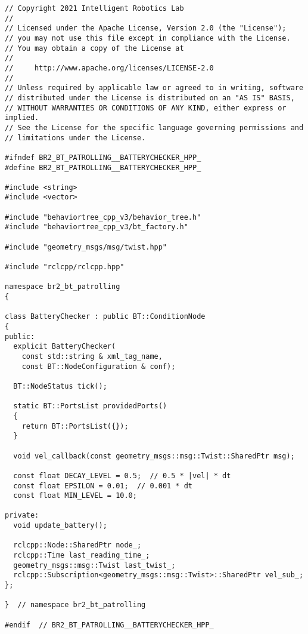  \footnotesize
\begin{tcolorbox}[sharp corners, colframe=gray!80, colback=LightGray, left=0pt, top=0pt, bottom=0pt, title=\texttt{br2\_bt\_patrolling/include/br2\_bt\_patrolling/BatteryChecker.hpp}]
  \begin{verbatim}
// Copyright 2021 Intelligent Robotics Lab
//
// Licensed under the Apache License, Version 2.0 (the "License");
// you may not use this file except in compliance with the License.
// You may obtain a copy of the License at
//
//     http://www.apache.org/licenses/LICENSE-2.0
//
// Unless required by applicable law or agreed to in writing, software
// distributed under the License is distributed on an "AS IS" BASIS,
// WITHOUT WARRANTIES OR CONDITIONS OF ANY KIND, either express or implied.
// See the License for the specific language governing permissions and
// limitations under the License.

#ifndef BR2_BT_PATROLLING__BATTERYCHECKER_HPP_
#define BR2_BT_PATROLLING__BATTERYCHECKER_HPP_

#include <string>
#include <vector>

#include "behaviortree_cpp_v3/behavior_tree.h"
#include "behaviortree_cpp_v3/bt_factory.h"

#include "geometry_msgs/msg/twist.hpp"

#include "rclcpp/rclcpp.hpp"

namespace br2_bt_patrolling
{

class BatteryChecker : public BT::ConditionNode
{
public:
  explicit BatteryChecker(
    const std::string & xml_tag_name,
    const BT::NodeConfiguration & conf);

  BT::NodeStatus tick();

  static BT::PortsList providedPorts()
  {
    return BT::PortsList({});
  }

  void vel_callback(const geometry_msgs::msg::Twist::SharedPtr msg);

  const float DECAY_LEVEL = 0.5;  // 0.5 * |vel| * dt
  const float EPSILON = 0.01;  // 0.001 * dt
  const float MIN_LEVEL = 10.0;

private:
  void update_battery();

  rclcpp::Node::SharedPtr node_;
  rclcpp::Time last_reading_time_;
  geometry_msgs::msg::Twist last_twist_;
  rclcpp::Subscription<geometry_msgs::msg::Twist>::SharedPtr vel_sub_;
};

}  // namespace br2_bt_patrolling

#endif  // BR2_BT_PATROLLING__BATTERYCHECKER_HPP_
    \end{verbatim}
    \end{tcolorbox}
  \normalsize

